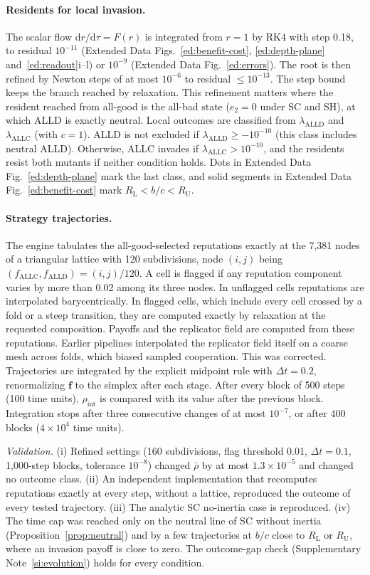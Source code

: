 \documentclass[fleqn,10pt]{wlscirep}
\newcommand{\dd}{\mathrm{d}}
\newcommand{\ALLC}{\mathrm{ALLC}}
\newcommand{\ALLD}{\mathrm{ALLD}}
\theoremstyle{plain}
\begin{document}
\paragraph{Residents for local invasion.} The scalar flow $\dd r/\dd\tau=F(r)$ is integrated from $r=1$ by RK4 with step 0.18, to residual $10^{-11}$ (Extended Data Figs.~\ref{ed:benefit-cost}, \ref{ed:depth-plane} and~\ref{ed:readout}i--l) or $10^{-9}$ (Extended Data Fig.~\ref{ed:errors}). The root is then refined by Newton steps of at most $10^{-6}$ to residual $\leq10^{-13}$. The step bound keeps the branch reached by relaxation. This refinement matters where the resident reached from all-good is the all-bad state ($e_2=0$ under SC and SH), at which ALLD is exactly neutral. Local outcomes are classified from $\lambda_{\ALLD}$ and $\lambda_{\ALLC}$ (with $c=1$). ALLD is not excluded if $\lambda_{\ALLD}\geq-10^{-10}$ (this class includes neutral ALLD). Otherwise, ALLC invades if $\lambda_{\ALLC}>10^{-10}$, and the residents resist both mutants if neither condition holds. Dots in Extended Data Fig.~\ref{ed:depth-plane} mark the last class, and solid segments in Extended Data Fig.~\ref{ed:benefit-cost} mark $R_{\mathrm L}<b/c<R_{\mathrm U}$.

\paragraph{Strategy trajectories.} The engine tabulates the all-good-selected reputations exactly at the 7,381 nodes of a triangular lattice with 120 subdivisions, node $(i,j)$ being $(f_{\ALLC},f_{\ALLD})=(i,j)/120$. A cell is flagged if any reputation component varies by more than 0.02 among its three nodes. In unflagged cells reputations are interpolated barycentrically. In flagged cells, which include every cell crossed by a fold or a steep transition, they are computed exactly by relaxation at the requested composition. Payoffs and the replicator field are computed from these reputations. Earlier pipelines interpolated the replicator field itself on a coarse mesh across folds, which biased sampled cooperation. This was corrected. Trajectories are integrated by the explicit midpoint rule with $\Delta t=0.2$, renormalizing $\bm f$ to the simplex after each stage. After every block of 500 steps (100 time units), $\rho_{\mathrm{int}}$ is compared with its value after the previous block. Integration stops after three consecutive changes of at most $10^{-7}$, or after 400 blocks ($4\times10^4$ time units).

\textit{Validation.} (i) Refined settings (160 subdivisions, flag threshold 0.01, $\Delta t=0.1$, 1,000-step blocks, tolerance $10^{-8}$) changed $\bar\rho$ by at most $1.3\times10^{-5}$ and changed no outcome class. (ii) An independent implementation that recomputes reputations exactly at every step, without a lattice, reproduced the outcome of every tested trajectory. (iii) The analytic SC no-inertia case is reproduced. (iv) The time cap was reached only on the neutral line of SC without inertia (Proposition~\ref{prop:neutral}) and by a few trajectories at $b/c$ close to $R_{\mathrm L}$ or $R_{\mathrm U}$, where an invasion payoff is close to zero. The outcome-gap check (Supplementary Note~\ref{si:evolution}) holds for every condition.
\end{document}
